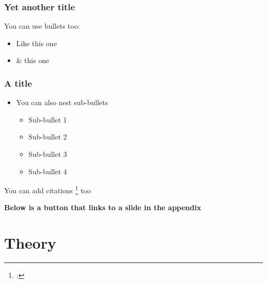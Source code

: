 \documentclass[
    11pt, %
    aspectratio=169, %
]{beamer}
\begin{document}
\begin{frame}
	\frametitle{Yet another title}
            You can use bullets too:\newline
            \begin{itemize}
                \item Like this one\newline
                \item \& this one
            \end{itemize}
\end{frame}

\begin{frame}
\label{Test} %
	\frametitle{A title}

        \begin{itemize}
            \item You can also nest sub-bullets
            \begin{itemize}
                \item Sub-bullet 1
                \item Sub-bullet 2
                \item Sub-bullet 3
                \item Sub-bullet 4 \newline
            \end{itemize}
        \end{itemize}

        You can add citations \footcite{Tjøstheim} too\newline

        \textbf{Below is a button that links to a slide in the appendix}
        
        \begin{center}
            \hyperlink{Figure}{}    
        \end{center}
\end{frame}

\section{Theory}
\end{document}
